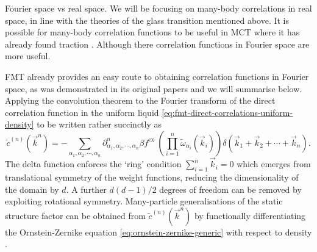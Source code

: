 Fourier space vs real space.
We will be focusing on many-body correlations in real space, in line with the theories of the glass transition mentioned above.
It is possible for many-body correlation functions to be useful in MCT where it has already found traction \cite{JanssenPRL2015,JanssenFP2018}.
Although there correlation functions in Fourier space are more useful.

FMT already provides an easy route to obtaining correlation functions in Fourier space, as was demonstrated in its original papers \cite{RosenfeldPRL1989,RosenfeldJCP1990} and we will summarise below.
Applying the convolution theorem to the Fourier transform of the direct correlation function in the uniform liquid \eqref{eq:fmt-direct-correlations-uniform-density} to be written rather succinctly as
\begin{equation}
  \tilde{c}^{(n)}(\vec{k}^n)
  =
  - \sum_{\alpha_1, \alpha_2, \cdots, \alpha_n}
  \partial^n_{\alpha_1, \alpha_2, \cdots, \alpha_n} \beta f^\mathrm{ex} \;
  \left( \prod_{i=1}^n \widetilde{\omega}_{\alpha_i}(\vec{k}_i) \right)
  \delta(\vec{k}_1 + \vec{k}_2 + \cdots + \vec{k}_n).
\end{equation}
The delta function enforces the `ring' condition $\sum_{i=1}^n \vec{k}_i = 0$ which emerges from translational symmetry of the weight functions, reducing the dimensionality of the domain by $d$.
A further $d(d-1)/2$ degrees of freedom%
can be removed by exploiting rotational symmetry.
Many-particle generalisations of the static structure factor can be obtained from $\tilde{c}^{(n)}(\vec{k}^n)$ by functionally differentiating the Ornstein-Zernike equation \eqref{eq:ornstein-zernike-generic} with respect to density \cite{BarratMP1988}.
